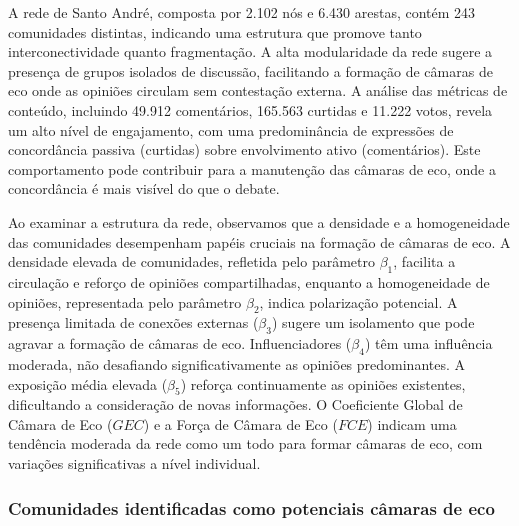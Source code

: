 A rede de Santo André, composta por 2.102 nós e 6.430 arestas, contém 243 comunidades distintas, indicando uma estrutura que promove tanto interconectividade quanto fragmentação. A alta modularidade da rede sugere a presença de grupos isolados de discussão, facilitando a formação de câmaras de eco onde as opiniões circulam sem contestação externa. A análise das métricas de conteúdo, incluindo 49.912 comentários, 165.563 curtidas e 11.222 votos, revela um alto nível de engajamento, com uma predominância de expressões de concordância passiva (curtidas) sobre envolvimento ativo (comentários). Este comportamento pode contribuir para a manutenção das câmaras de eco, onde a concordância é mais visível do que o debate.

Ao examinar a estrutura da rede, observamos que a densidade e a homogeneidade das comunidades desempenham papéis cruciais na formação de câmaras de eco. A densidade elevada de comunidades, refletida pelo parâmetro $\beta_1$, facilita a circulação e reforço de opiniões compartilhadas, enquanto a homogeneidade de opiniões, representada pelo parâmetro $\beta_2$, indica polarização potencial. A presença limitada de conexões externas ($\beta_3$) sugere um isolamento que pode agravar a formação de câmaras de eco. Influenciadores ($\beta_4$) têm uma influência moderada, não desafiando significativamente as opiniões predominantes. A exposição média elevada ($\beta_5$) reforça continuamente as opiniões existentes, dificultando a consideração de novas informações. O Coeficiente Global de Câmara de Eco ($GEC$) e a Força de Câmara de Eco ($FCE$) indicam uma tendência moderada da rede como um todo para formar câmaras de eco, com variações significativas a nível individual.

\subsubsection*{Comunidades identificadas como potenciais câmaras de eco}

